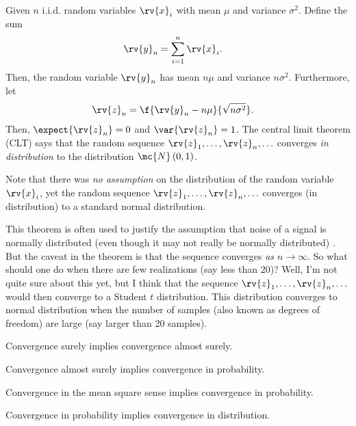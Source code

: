 \begin{theoremBox}
   Given $n$ i.i.d. random variables $\rv{x}_{i}$ with mean $\mu$ and variance $\sigma^{2}$. Define the sum
   \begin{align}
       \rv{y}_{n} &= \sum_{i=1}^{n}\rv{x}_{i}.
   \end{align}
   Then, the random variable $\rv{y}_{n}$ has mean $n\mu$ and variance $n\sigma^{2}$. Furthermore, let
   \begin{align}
       \rv{z}_{n} &= \f{\rv{y}_{n} - n\mu}{\sqrt{n\sigma^{2}}}.
   \end{align}
   Then, $\expect{\rv{z}_{n}} = 0$ and $\var{\rv{z}_{n}} = 1$. The central limit theorem (CLT) says that the random sequence $\rv{z}_{1},\ldots, \rv{z}_{n}, \ldots$ converges \emph{in distribution} to the distribution $\mc{N}\left( 0,1 \right)$. 
\end{theoremBox}
\begin{remarkBox}
    Note that there was \emph{no assumption} on the distribution of the random variable $\rv{x}_{i}$, yet the random sequence $\rv{z}_{1},\ldots, \rv{z}_{n},\ldots$ converges (in distribution) to a standard normal distribution.

    This theorem is often used to justify the assumption that noise of a signal is normally distributed (even though it may not really be normally distributed) \cite{liEvaluationEstimationAlgorithms2012}.
    But the caveat in the theorem is that the sequence converges \emph{as $n\to\infty$}. So what should one do when there are few realizations (say less than 20)? Well, I'm not quite sure about this yet, but I think that the sequence $\rv{z}_{1}, \ldots, \rv{z}_{n}, \ldots$ would then converge to a Student $t$ distribution. This distribution converges to normal distribution when the number of samples (also known as degrees of freedom) are large (say larger than 20 samples).
\end{remarkBox}


\begin{theoremBox}
     Convergence surely implies convergence almost surely.
\end{theoremBox}

\begin{theoremBox}
     Convergence almost surely implies convergence in probability.
\end{theoremBox}

\begin{theoremBox}
     Convergence in the mean square sense implies convergence in probability.
\end{theoremBox}
\begin{theoremBox}
     Convergence in probability implies convergence in distribution.
\end{theoremBox}
